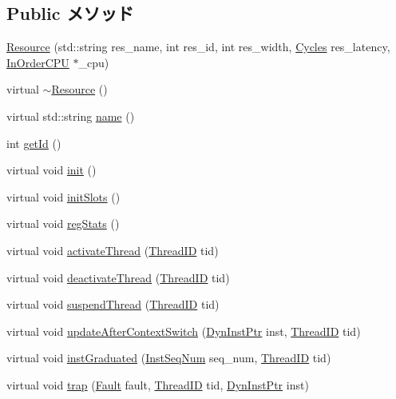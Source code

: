 \subsection*{Public メソッド}
\begin{DoxyCompactItemize}
\item 
\hyperlink{classResource_a0fa53d2551f0069c7ce630fca9105c63}{Resource} (std::string res\_\-name, int res\_\-id, int res\_\-width, \hyperlink{classCycles}{Cycles} res\_\-latency, \hyperlink{classInOrderCPU}{InOrderCPU} $\ast$\_\-cpu)
\item 
virtual \hyperlink{classResource_af04be79e8cd12b4e3ab7361f3237ed26}{$\sim$Resource} ()
\item 
virtual std::string \hyperlink{classResource_af1801e31af6399bccce114ab12575168}{name} ()
\item 
int \hyperlink{classResource_a67283be3f45257d1e0c474c563ebb6b6}{getId} ()
\item 
virtual void \hyperlink{classResource_a02fd73d861ef2e4aabb38c0c9ff82947}{init} ()
\item 
virtual void \hyperlink{classResource_aef17f15baa657a3b0b17d6a2c855fb02}{initSlots} ()
\item 
virtual void \hyperlink{classResource_ac1739a9be0fbd5d96cf441cd3b2c1c78}{regStats} ()
\item 
virtual void \hyperlink{classResource_ab75d2f4e158982d66b44263d96cdd058}{activateThread} (\hyperlink{base_2types_8hh_ab39b1a4f9dad884694c7a74ed69e6a6b}{ThreadID} tid)
\item 
virtual void \hyperlink{classResource_ad11d9216ad92d9036ebf37844cf6e706}{deactivateThread} (\hyperlink{base_2types_8hh_ab39b1a4f9dad884694c7a74ed69e6a6b}{ThreadID} tid)
\item 
virtual void \hyperlink{classResource_ad2f3fddbc6dd67ef5e3a84cd7a9814e6}{suspendThread} (\hyperlink{base_2types_8hh_ab39b1a4f9dad884694c7a74ed69e6a6b}{ThreadID} tid)
\item 
virtual void \hyperlink{classResource_a2cf5450ce736e0c76aca0d4ef24b922a}{updateAfterContextSwitch} (\hyperlink{classRefCountingPtr}{DynInstPtr} inst, \hyperlink{base_2types_8hh_ab39b1a4f9dad884694c7a74ed69e6a6b}{ThreadID} tid)
\item 
virtual void \hyperlink{classResource_ad09300971c77caba13bf59e77b99ea24}{instGraduated} (\hyperlink{inst__seq_8hh_a258d93d98edaedee089435c19ea2ea2e}{InstSeqNum} seq\_\-num, \hyperlink{base_2types_8hh_ab39b1a4f9dad884694c7a74ed69e6a6b}{ThreadID} tid)
\item 
virtual void \hyperlink{classResource_a1eb2a0229740a87bde0282416035b864}{trap} (\hyperlink{classRefCountingPtr}{Fault} fault, \hyperlink{base_2types_8hh_ab39b1a4f9dad884694c7a74ed69e6a6b}{ThreadID} tid, \hyperlink{classRefCountingPtr}{DynInstPtr} inst)

\end{DoxyCompactItemize}
